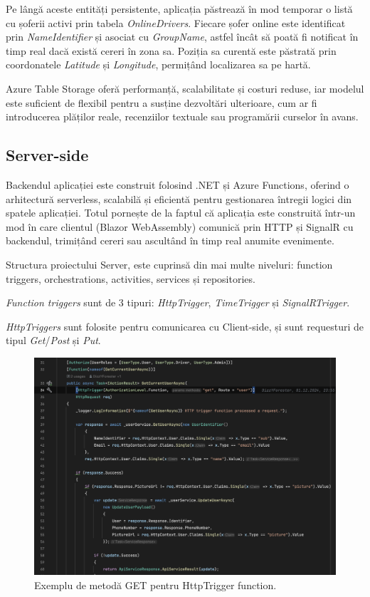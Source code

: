 Pe lângă aceste entități persistente, aplicația păstrează în mod temporar o listă cu șoferii activi prin tabela \textit{OnlineDrivers}.
Fiecare șofer online este identificat prin \textit{NameIdentifier} și asociat cu \textit{GroupName}, astfel încât să poată fi notificat
în timp real dacă există cereri în zona sa. Poziția sa curentă este păstrată prin coordonatele \textit{Latitude} și \textit{Longitude},
permițând localizarea sa pe hartă.

Azure Table Storage oferă performanță, scalabilitate și costuri reduse, iar modelul este suficient
de flexibil pentru a susține dezvoltări ulterioare, cum ar fi introducerea plăților reale, recenziilor textuale
sau programării curselor în avans.

\subsection{Server-side}

Backendul aplicației este construit folosind .NET și Azure Functions, oferind o arhitectură
serverless, scalabilă și eficientă pentru gestionarea întregii logici din spatele aplicației.
Totul pornește de la faptul că aplicația este construită într-un mod în care clientul
(Blazor WebAssembly) comunică prin HTTP și SignalR cu backendul, trimițând cereri sau
ascultând în timp real anumite evenimente.

Structura proiectului Server, este cuprinsă din mai multe niveluri: function triggers, orchestrations,
activities, services și repositories.

\textit{Function triggers} sunt de 3 tipuri: \textit{HttpTrigger}, \textit{TimeTrigger} și \textit{SignalRTrigger}.

\textit{HttpTriggers} sunt folosite pentru comunicarea cu Client-side, și sunt requesturi de tipul \textit{Get}/\textit{Post} și \textit{Put}.
\begin{figure}[H]
    \centering
    \includegraphics[width=16cm]{Assets/HttpTrigger.png}
    \caption{Exemplu de metodă GET pentru HttpTrigger function.}
    \label{fig:HttpTrigger}
\end{figure}

